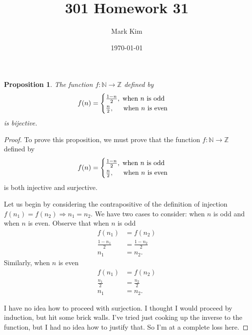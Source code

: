 \documentclass[12pt]{amsart}
\title{301 Homework 31}
\author{Mark Kim}
\date{\today}
\newcommand{\Z}{\mathbb{Z}}
\newcommand{\N}{\mathbb{N}}
\newtheorem*{proposition}{Proposition}
\begin{document}
\maketitle

\begin{proposition}
The function $f\colon \N\rightarrow\Z$ defined by
\begin{align*}
f(n) =
\begin{cases}
\frac{1-n}{2},\text{\hspace{.1cm}when $n$ is odd}\\
\frac{n}{2},\text{\hspace{.5cm}when $n$ is even}
\end{cases}
\end{align*}
is bijective.
\end{proposition}

\begin{proof}
To prove this proposition, we must prove that the function $f\colon \N\rightarrow\Z$ defined by
\begin{align*}
f(n) =
\begin{cases}
\frac{1-n}{2},\text{\hspace{.1cm}when $n$ is odd}\\
\frac{n}{2},\text{\hspace{.5cm}when $n$ is even}
\end{cases}
\end{align*}
is both injective and surjective.

Let us begin by considering the contrapositive of the definition of injection $f(n_1)=f(n_2)\Rightarrow n_1=n_2$.  We have two cases to consider: when $n$ is odd and when $n$ is even.  Observe that when $n$ is odd
\begin{align*}
f(n_1) &= f(n_2)\\
\frac{1-n_1}{2} &= \frac{1-n_2}{2}\\
n_1 &= n_2.
\end{align*}
Similarly, when $n$ is even
\begin{align*}
f(n_1) &= f(n_2)\\
\frac{n_1}{2} &= \frac{n_2}{2}\\
n_1 &= n_2.
\end{align*}

I have no idea how to proceed with surjection.  I thought I would proceed by induction, but hit some brick walls.  I've tried just cooking up the inverse to the function, but I had no idea how to justify that.  So I'm at a complete loss here.
\end{proof}
\end{document}
